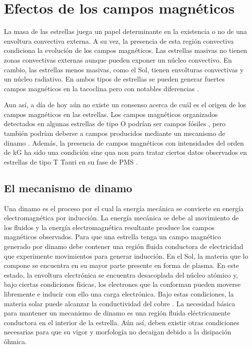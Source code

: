\section{Efectos de los campos magnéticos}
La masa de las estrellas juega un papel determinante en la existencia o no de una envoltura convectiva externa. A su vez, la presencia de esta región convectiva condiciona la evolución de los campos magnéticos. Las estrellas masivas no tienen zonas convectivas externas aunque pueden exponer un núcleo convectivo. En cambio, las estrellas menos masivas, como el Sol, tienen envolturas convectivas y un núcleo radiativo. En ambos tipos de estrellas se pueden generar fuertes campos magnéticos en la tacoclina pero con notables diferencias \citep{Chabrier2006,Charbonneau2010}.\par

Aun así, a día de hoy aún no existe un consenso acerca de cuál es el origen de los campos magnéticos en las estrellas. Los campos magnéticos organizados detectados en algunas estrellas de tipo O \citep{Wade2010} podrían ser campos fósiles \citep{Dudorov2014}, pero también podrían deberse a campos producidos mediante un mecanismo de dinamo \citep{Cantiello2009}. Además, la presencia de campos magnéticos con intensidades del orden de kG \citep{Hussain2014} ha sido una condición sine qua non para tratar ciertos datos observados en estrellas de tipo T Tauri en su fase de PMS \citep{Johns-Krull2007}.\par

\subsection{El mecanismo de dinamo}
Una dinamo es el proceso por el cual la energía mecánica se convierte en energía electromagnética por inducción. La energía mecánica se debe al movimiento de los fluidos y la energía electromagnética resultante produce los campos magnéticos observados. Para que una estrella tenga un campo magnético generado por dinamo debe contener una región fluida conductora de electricidad que experimente movimientos para generar inducción. En el Sol, la materia que lo compone se encuentra en su mayor parte presente en forma de plasma. En este estado, la envoltura electrónica se encuentra desacoplada del núcleo atómico y, bajo ciertas condiciones físicas, los electrones que la conforman pueden moverse libremente e inducir con ello una carga electrónica. Bajo estas condiciones, la materia solar puede alcanzar la conductividad del cobre \citep{Banisch2009}. La necesidad básica para mantener un mecanismo de dinamo es una región fluida eléctricamente conductora en el interior de la estrella. Aún así, deben existir otras condiciones necesarias para que su vigor y morfología no decaigan debido a la disipación óhmica. \par

